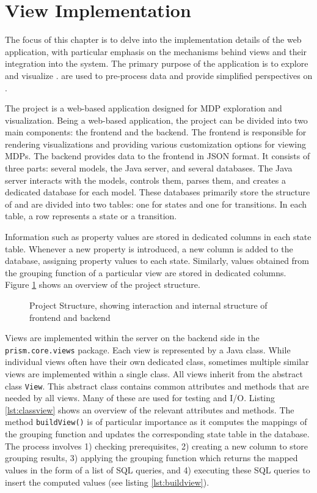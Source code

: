 \documentclass[preview]{standalone}
\begin{document}
\section{View Implementation} \label{ch:viewimpl}

The focus of this chapter is to delve into the implementation details of the \emph{\pmcvis} web application, with particular emphasis on the mechanisms behind views and their integration into the system. The primary purpose of the application is to explore and visualize \mdpsN. \viewsNC are used to pre-process data and provide simplified perspectives on \mdpsN.

The \pmcvis project is a web-based application designed for MDP exploration and visualization. Being a web-based application, the project can be divided into two main components: the frontend and the backend. The frontend is responsible for rendering visualizations and providing various customization options for viewing MDPs. The backend provides data to the frontend in JSON format. It consists of three parts: several \prism models, the Java server, and several databases. The Java server interacts with the \prism models, controls them, parses them, and creates a dedicated database for each model. These databases primarily store the structure of \mdpsN and are divided into two tables: one for states and one for transitions. In each table, a row represents a state or a transition.

Information such as property values are stored in dedicated columns in each state table. Whenever a new property is introduced, a new column is added to the database, assigning property values to each state. Similarly, values obtained from the grouping function of a particular view are stored in dedicated columns. Figure \ref{fig:projectstructure} shows an overview of the project structure.

\begin{figure}[h]
	
	\caption{Project Structure, showing interaction and internal structure of frontend and backend}
	\label{fig:projectstructure}
\end{figure}

Views are implemented within the server on the backend side in the 
\texttt{prism.core}\texttt{.views} package.
Each view is represented by a Java class. While individual views often have their own dedicated class, sometimes multiple similar views are implemented within a single class. All views inherit from the abstract class \texttt{View}. This abstract class contains common attributes and methods that are needed by all views. Many of these are used for testing and I/O. Listing \ref{lst:classview} shows an overview of the relevant attributes and methods. The method \texttt{buildView()} is of particular importance as it computes the mappings of the grouping function and updates the corresponding state table in the database. The process involves 1) checking prerequisites, 2) creating a new column to store grouping results, 3) applying the grouping function which returns the mapped values in the form of a list of SQL queries, and 4) executing these SQL queries to insert the computed values (see listing \ref{lst:buildview}).
\end{document}
